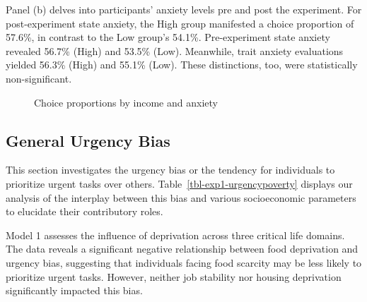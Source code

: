 \documentclass[
]{report}
\begin{document}
Panel (b) delves into participants' anxiety levels pre and post the
experiment. For post-experiment state anxiety, the High group manifested
a choice proportion of 57.6\%, in contrast to the Low group's 54.1\%.
Pre-experiment state anxiety revealed 56.7\% (High) and 53.5\% (Low).
Meanwhile, trait anxiety evaluations yielded 56.3\% (High) and 55.1\%
(Low). These distinctions, too, were statistically non-significant.

\begin{figure}

\begin{minipage}[t]{0.50\linewidth}

{\centering 


}

\end{minipage}%
%
\begin{minipage}[t]{0.50\linewidth}

{\centering 


}

\end{minipage}%

\caption{\label{fig-exp1-tradeoff}Choice proportions by income and
anxiety}

\end{figure}

\hypertarget{general-urgency-bias-1}{%
\subsection{General Urgency Bias}\label{general-urgency-bias-1}}

This section investigates the urgency bias or the tendency for
individuals to prioritize urgent tasks over others.
Table~\ref{tbl-exp1-urgencypoverty} displays our analysis of the
interplay between this bias and various socioeconomic parameters to
elucidate their contributory roles.

Model 1 assesses the influence of deprivation across three critical life
domains. The data reveals a significant negative relationship between
food deprivation and urgency bias, suggesting that individuals facing
food scarcity may be less likely to prioritize urgent tasks. However,
neither job stability nor housing deprivation significantly impacted
this bias.
\end{document}
